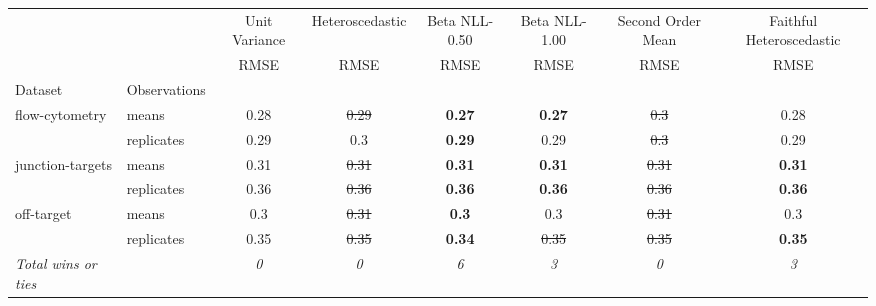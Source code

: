 \begin{tabular}{ll|c|c|c|c|c|c}
\toprule
{} & {} & {Unit Variance} & {Heteroscedastic} & {Beta NLL-0.50} & {Beta NLL-1.00} & {Second Order Mean} & {Faithful Heteroscedastic} \\
{} & {} & {RMSE} & {RMSE} & {RMSE} & {RMSE} & {RMSE} & {RMSE} \\
{Dataset} & {Observations} & {} & {} & {} & {} & {} & {} \\
\midrule
\multirow[t]{2}{*}{flow-cytometry} & means & 0.28 & \sout{0.29} & \textbf{0.27} & \textbf{0.27} & \sout{0.3} & 0.28 \\
 & replicates & 0.29 & 0.3 & \textbf{0.29} & 0.29 & \sout{0.3} & 0.29 \\
\multirow[t]{2}{*}{junction-targets} & means & 0.31 & \sout{0.31} & \textbf{0.31} & \textbf{0.31} & \sout{0.31} & \textbf{0.31} \\
 & replicates & 0.36 & \sout{0.36} & \textbf{0.36} & \textbf{0.36} & \sout{0.36} & \textbf{0.36} \\
\multirow[t]{2}{*}{off-target} & means & 0.3 & \sout{0.31} & \textbf{0.3} & 0.3 & \sout{0.31} & 0.3 \\
 & replicates & 0.35 & \sout{0.35} & \textbf{0.34} & \sout{0.35} & \sout{0.35} & \textbf{0.35} \\
\textit{{Total wins or ties}} &  & \textit{0} & \textit{0} & \textit{6} & \textit{3} & \textit{0} & \textit{3} \\
\bottomrule
\end{tabular}
